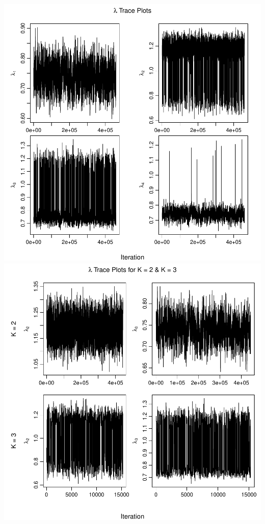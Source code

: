 \documentclass[]{article}
\numberwithin{equation}{section}
\begin{document}
\includegraphics{thesis_draft_files/figure-latex/lambda_traces-1.pdf}
\includegraphics{thesis_draft_files/figure-latex/lambda_traces-2.pdf}
\end{document}
